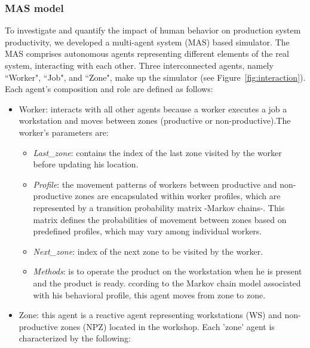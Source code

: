 \documentclass[review,12pt, 3p, times]{elsarticle}
\begin{document}
\subsubsection{MAS model}
To investigate and quantify the impact of human behavior on production system productivity, we developed a multi-agent system (MAS) based simulator. The MAS comprises autonomous agents representing different elements of the real system, interacting with each other. Three interconnected agents, namely “Worker", “Job", and “Zone", make up the simulator (see Figure~\ref{fig:interaction}). Each agent's composition and role are defined as follows: 
\begin{itemize}
    \item Worker:  interacts with all other agents because a worker executes a job   a workstation and moves between zones (productive or non-productive).The worker's parameters are:
    \begin{itemize}
        \item \textit{Last\_zone}: contains the index of the last zone visited by the worker before updating his location.
	\item \textit{Profile}: the movement patterns of workers between productive and non-productive zones are encapsulated within worker
        profiles, which are represented by a transition probability matrix -Markov chains-. This matrix defines the probabilities of movement between zones based on predefined profiles, which may vary among individual workers.  
        \item \textit{Next\_zone}: index of the next zone to be visited by the worker.
        \item \textit{Methods}:  is to operate the product on the workstation when he is present and the product is ready.  ccording to the Markov chain model associated with his behavioral profile, this agent moves from zone to zone.  
    \end{itemize} 
    \item Zone: this agent is a reactive agent representing workstations (WS) and non-productive zones (NPZ) located in the workshop. Each 'zone' agent is characterized by the following:

\end{itemize}
\end{document}
